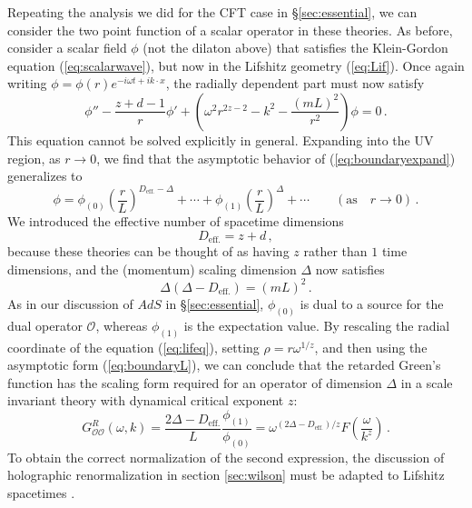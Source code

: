\documentclass[10pt, oneside]{book}
\def\be{\begin{equation}}
\def\ee{\end{equation}}
\def\ocal{{\mathcal{O}}}
\begin{document}
\begin{doublespace}
Repeating the analysis we did for the CFT case in \S\ref{sec:essential}, we can consider the two point function of a scalar operator in these theories. As before, consider a scalar field $\phi$ (not the dilaton above) that satisfies the Klein-Gordon equation (\ref{eq:scalarwave}), but now in the Lifshitz geometry (\ref{eq:Lif}). Once again writing $\phi = \phi(r) e^{- i \omega t + i k \cdot x}$, the  radially dependent part must now satisfy
\be\label{eq:lifeq}
\phi'' - \frac{z+d-1}{r} \phi' + \left(\omega^2 r^{2z-2} - k^2 - \frac{(mL)^2}{r^2} \right)\phi = 0 \,.
\ee
This equation cannot be solved explicitly in general. Expanding into the UV region, as $r \to 0$, we find that the asymptotic behavior of (\ref{eq:boundaryexpand}) generalizes to
\be\label{eq:boundaryL}
\phi = \phi_{(0)} \left(\frac{r}{L}\right)^{D_\text{eff.}-\Delta} + \cdots + \phi_{(1)}\left(\frac{r}{L}\right)^{\Delta} + \cdots \qquad (\text{as} \quad r \to 0) \,.
\ee
We introduced the effective number of spacetime dimensions
\be
D_\text{eff.} = z + d \,,
\ee
because these theories can be thought of as having $z$ rather than $1$ time dimensions,
and the (momentum) scaling dimension $\Delta$ now satisfies
\be\label{eq:deltaL}
\Delta (\Delta - D_\text{eff.}) = \left(m L\right)^2 \,.
\ee
 As in our discussion of $AdS$ in \S\ref{sec:essential}, $\phi_{(0)}$ is dual to a source for the dual operator $\ocal$, whereas
$\phi_{(1)}$ is the expectation value. By rescaling the radial coordinate of the equation (\ref{eq:lifeq}), setting $\rho = r \omega^{1/z}$, and then using the asymptotic form (\ref{eq:boundaryL}), we can conclude that the retarded Green's function has the scaling form required for an operator of dimension $\Delta$ in a scale invariant theory with dynamical critical exponent $z$:
\be\label{eq:scalingformwq}
G^R_{\ocal\ocal}(\omega,k) = \frac{2 \Delta - D_\text{eff.}}{L} \frac{\phi_{(1)}}{\phi_{(0)}} = \omega^{(2 \Delta- D_\text{eff.})/z} F\left(\frac{\omega}{k^z}\right) \,.
\ee
To obtain the correct normalization of the second expression, the discussion of holographic renormalization in section \ref{sec:wilson} must be adapted to Lifshitz spacetimes \cite{Taylor:2008tg}.


\end{doublespace}
\end{document}
